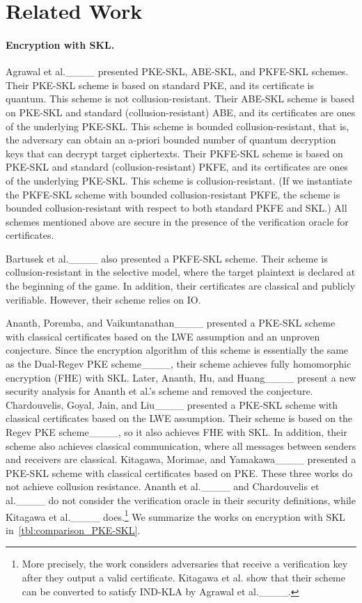 \section{Related Work}
\label{sec:related_work}
\paragraph{Encryption with SKL.}
Agrawal et al.____ presented PKE-SKL, ABE-SKL, and PKFE-SKL schemes.
Their PKE-SKL scheme is based on standard PKE, and its certificate is quantum. This scheme is not collusion-resistant.
Their ABE-SKL scheme is based on PKE-SKL and standard (collusion-resistant) ABE, and its certificates are ones of the underlying PKE-SKL.
This scheme is bounded collusion-resistant, that is, the adversary can
obtain an a-priori bounded number of quantum decryption keys that can decrypt target ciphertexts.
Their PKFE-SKL scheme is based on PKE-SKL and standard (collusion-resistant) PKFE, and its certificates are ones of the underlying PKE-SKL.
This scheme is collusion-resistant. (If we instantiate the PKFE-SKL scheme with bounded collusion-resistant PKFE, the scheme is bounded collusion-resistant with respect to both standard PKFE and SKL.)
All schemes mentioned above are secure in the presence of the verification oracle for certificates.

Bartusek et al.____ also presented a PKFE-SKL scheme.
Their scheme is collusion-resistant in the selective model, where the target plaintext is declared at the beginning of the game. In addition, their certificates are classical and publicly verifiable. However, their scheme relies on IO.

Ananth, Poremba, and Vaikuntanathan____ presented a PKE-SKL scheme with classical certificates based on the LWE assumption and an unproven conjecture.
Since the encryption algorithm of this scheme is essentially the same as the Dual-Regev PKE scheme____, their scheme achieves fully homomorphic encryption (FHE) with SKL. Later, Ananth, Hu, and Huang____ present a new security analysis for Ananth et al.'s scheme and removed the conjecture.
Chardouvelis, Goyal, Jain, and Liu____ presented a PKE-SKL scheme with classical certificates based on the LWE assumption. Their scheme is based on the Regev PKE scheme____, so it also achieves FHE with SKL. In addition, their scheme also achieves classical communication, where all messages between senders and receivers are classical.
Kitagawa, Morimae, and Yamakawa____ presented
a PKE-SKL scheme with classical certificates based on PKE.
These three works do not achieve collusion resistance.
Ananth et al.____ and Chardouvelis et al.____ do not consider the verification oracle in their security definitions, while Kitagawa et al.____ does.\footnote{More precisely, the work considers adversaries that receive a verification key after they output a valid certificate. Kitagawa et al. show that their scheme can be converted to satisfy IND-KLA by Agrawal et al.____.}
We summarize the works on encryption with SKL in~\cref{tbl:comparison_PKE-SKL}.

